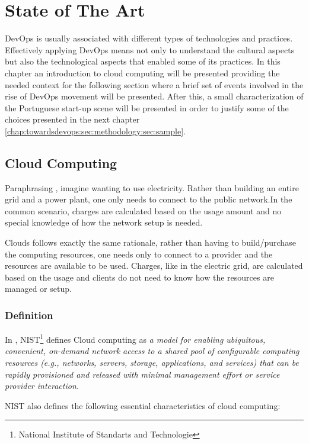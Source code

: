 \chapter{State of The Art} \label{chap:stateoftheart}
DevOps is usually associated with different types of technologies and practices. Effectively applying DevOps means not only to understand the cultural aspects but also the technological aspects that enabled some of its practices.
In this chapter an introduction to cloud computing will be presented providing the needed context for the following section where a brief set of events involved in the rise of DevOps movement will be presented. After this, a small characterization of the Portuguese start-up scene will be presented in order to justify some of the choices presented in the next chapter \ref{chap:towardsdevops:sec:methodology:sec:sample}.

    \section{Cloud Computing} \label{chap:stateoftheart:sec:cloud}

        Paraphrasing \cite{Bass}, imagine  wanting to use electricity. Rather than building an entire grid and a power plant, one only needs to connect to the public network.In the common scenario, charges are calculated based on the usage amount and no special knowledge of how the network setup is needed.

        Clouds follows exactly the same rationale, rather than having to build/purchase the computing resources, one needs only to connect to a provider and the resources are available to be used. Charges, like in the electric grid, are calculated based on the usage and clients do not need to know how the resources are managed or setup.

        \subsection{Definition}
        In \cite{Mell2011}, NIST\footnote{National Institute of Standarts and Technologie} defines Cloud computing as \textit{a model for enabling ubiquitous, convenient, on-demand network access to a shared pool of configurable computing resources (e.g., networks, servers, storage, applications, and services) that can be rapidly provisioned and released with minimal management effort or service provider interaction.}

        NIST also defines the following essential characteristics of cloud computing:

